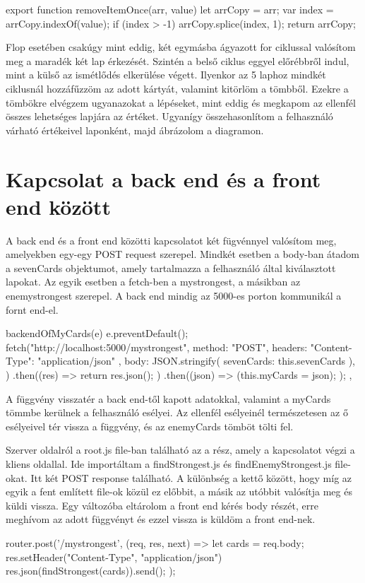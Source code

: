 \begin{python}
export function removeItemOnce(arr, value) {
    let arrCopy = arr;
    var index = arrCopy.indexOf(value);
    if (index > -1) {
      arrCopy.splice(index, 1);
    }
    return arrCopy;
}
\end{python}

Flop esetében csakúgy mint eddig, két egymásba ágyazott for ciklussal valósítom meg a maradék két lap érkezését. Szintén a belső ciklus eggyel előrébbről indul, mint a külső az ismétlődés elkerülése végett. Ilyenkor az 5 laphoz mindkét ciklusnál hozzáfűzzöm az adott kártyát, valamint kitörlöm a tömbből. Ezekre a tömbökre elvégzem ugyanazokat a lépéseket, mint eddig és megkapom az ellenfél összes lehetséges lapjára az értéket. Ugyanígy összehasonlítom a felhasználó várható értékeivel laponként, majd ábrázolom a diagramon.

\section{Kapcsolat a back end és a front end között}
A back end és a front end közötti kapcsolatot két fügvénnyel valósítom meg, amelyekben egy-egy POST request szerepel. Mindkét esetben a body-ban átadom a sevenCards objektumot, amely tartalmazza a felhasználó által kiválasztott lapokat. Az egyik esetben a fetch-ben a mystrongest, a másikban az enemystrongest szerepel. A back end mindig az 5000-es porton kommunikál a fornt end-el.

\begin{python}
backendOfMyCards(e) {
      e.preventDefault();
      fetch("http://localhost:5000/mystrongest", {
        method: "POST",
        headers: { "Content-Type": "application/json" },
        body: JSON.stringify({ sevenCards: this.sevenCards }),
      })
        .then((res) => {
          return res.json();
        })
        .then((json) => {
          (this.myCards = json);
        });
    },
\end{python}

A függvény visszatér a back end-től kapott adatokkal, valamint a myCards tömmbe kerülnek a felhasználó esélyei. Az ellenfél esélyeinél természetesen az ő esélyeivel tér vissza a függvény, és az enemyCards tömböt tölti fel.

Szerver oldalról a root.js file-ban található az a rész, amely a kapcsolatot végzi a kliens oldallal. Ide importáltam a findStrongest.js és findEnemyStrongest.js file-okat. Itt két POST response található. A különbség a kettő között, hogy míg az egyik a fent említett file-ok közül ez előbbit, a másik az utóbbit valósítja meg és küldi vissza. Egy változóba eltárolom a front end kérés body részét, erre meghívom az adott függvényt és ezzel vissza is küldöm a front end-nek.

\begin{python}
router.post('/mystrongest', (req, res, next) => {
    let cards = req.body;
    res.setHeader("Content-Type", "application/json")
    res.json(findStrongest(cards)).send();
});
\end{python}